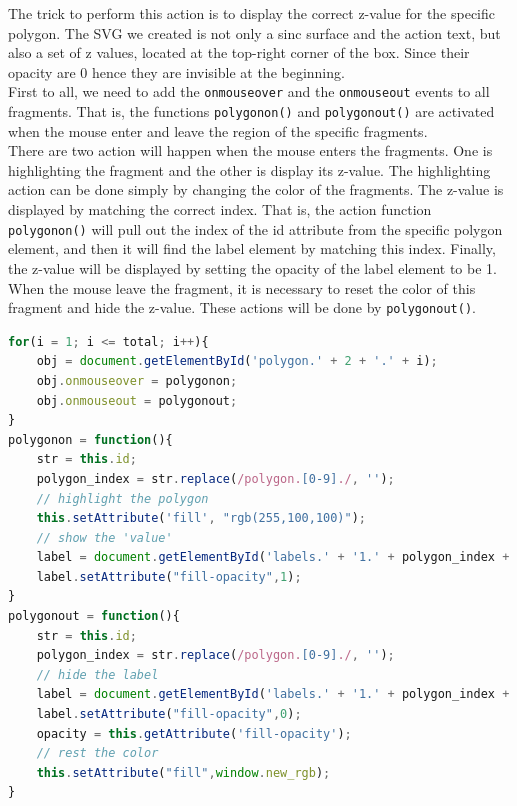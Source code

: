 \documentclass{report}
\begin{document}
The trick to perform this action is to display the correct z-value for the specific polygon. The SVG we created is not only a sinc surface and the action text, but also a set of z values, located at the top-right corner of the box. Since their opacity are 0 hence they are invisible at the beginning.\\

First to all, we need to add the \texttt{onmouseover} and the \texttt{onmouseout} events to all fragments. That is, the functions \texttt{polygonon()} and \texttt{polygonout()} are activated when the mouse enter and leave the region of the specific fragments.\\

There are two action will happen when the mouse enters the fragments. One is highlighting the fragment and the other is display its z-value. The highlighting action can be done simply by changing the color of the fragments. The z-value is displayed by matching the correct index. That is, the action function \texttt{polygonon()} will pull out the index of the id attribute from the specific polygon element, and then it will find the label element by matching this index. Finally, the z-value will be displayed by setting the opacity of the label element to be 1. When the mouse leave the fragment, it is necessary to reset the color of this fragment and hide the z-value. These actions will be done by \texttt{polygonout()}.

\begin{lstlisting}[language = JavaScript]
for(i = 1; i <= total; i++){
    obj = document.getElementById('polygon.' + 2 + '.' + i);
    obj.onmouseover = polygonon;
    obj.onmouseout = polygonout;
}
polygonon = function(){
    str = this.id;
    polygon_index = str.replace(/polygon.[0-9]./, '');
    // highlight the polygon
    this.setAttribute('fill', "rgb(255,100,100)");
    // show the 'value'
    label = document.getElementById('labels.' + '1.' + polygon_index + '.text');
    label.setAttribute("fill-opacity",1);
}
polygonout = function(){
    str = this.id;
    polygon_index = str.replace(/polygon.[0-9]./, '');
    // hide the label
    label = document.getElementById('labels.' + '1.' + polygon_index + '.text');
    label.setAttribute("fill-opacity",0);
    opacity = this.getAttribute('fill-opacity');
    // rest the color
    this.setAttribute("fill",window.new_rgb);
}
\end{lstlisting}
\end{document}
